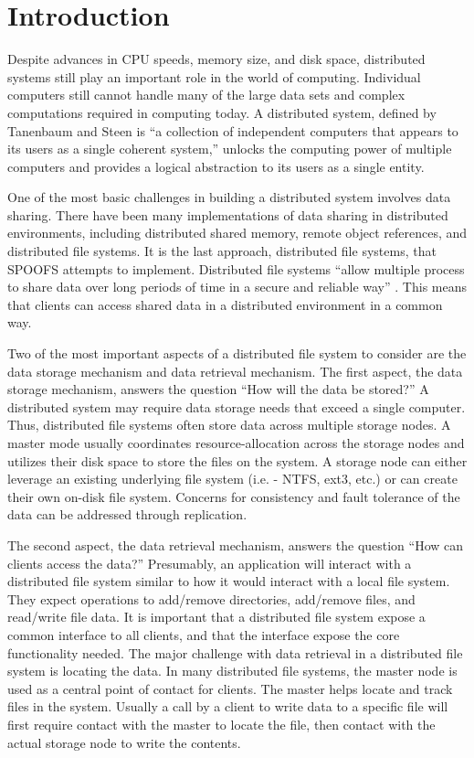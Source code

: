 
\section{Introduction}
\label{sec:introduction}

Despite advances in CPU speeds, memory size, and disk space, distributed systems still play an important role in the world of computing.  Individual computers still cannot handle many of the large data sets and complex computations required in computing today.  A distributed system, defined by Tanenbaum and Steen \cite{tanenbaum_text06} is ``a collection of independent computers that appears to its users as a single coherent system,'' unlocks the computing power of multiple computers and provides a logical abstraction to its users as a single entity.

One of the most basic challenges in building a distributed system involves data sharing.  There have been many implementations of data sharing in distributed environments, including distributed shared memory, remote object references, and distributed file systems.  It is the last approach, distributed file systems, that SPOOFS attempts to implement.  Distributed file systems ``allow multiple process to share data over long periods of time in a secure and reliable way'' \cite{tanenbaum_text06}.  This means that clients can access shared data in a distributed environment in a common way.

Two of the most important aspects of a distributed file system to consider are the data storage mechanism and data retrieval mechanism.  The first aspect, the data storage mechanism, answers the question ``How will the data be stored?''  A distributed system may require data storage needs that exceed a single computer.  Thus, distributed file systems often store data across multiple storage nodes.  A master mode usually coordinates resource-allocation across the storage nodes and utilizes their disk space to store the files on the system.  A storage node can either leverage an existing underlying file system (i.e. - NTFS, ext3, etc.) or can create their own on-disk file system.  Concerns for consistency and fault tolerance of the data can be addressed through replication.

The second aspect, the data retrieval mechanism, answers the question ``How can clients access the data?''  Presumably, an application will interact with a distributed file system similar to how it would interact with a local file system.  They expect operations to add/remove directories, add/remove files, and read/write file data.  It is important that a distributed file system expose a common interface to all clients, and that the interface expose the core functionality needed.  The major challenge with data retrieval in a distributed file system is locating the data.  In many distributed file systems, the master node is used as a central point of contact for clients.  The master helps locate and track files in the system.  Usually a call by a client to write data to a specific file will first require contact with the master to locate the file, then contact with the actual storage node to write the contents.

